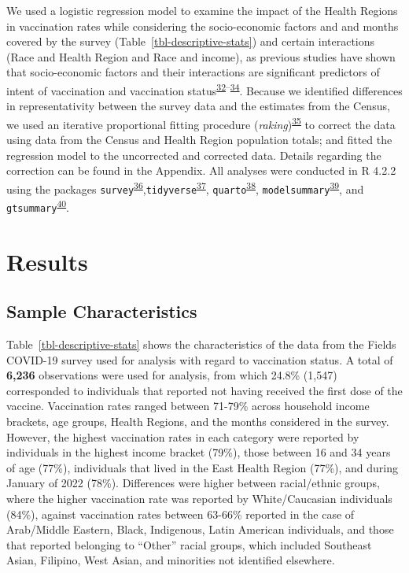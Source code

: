 \documentclass[
  letterpaper,
  DIV=11,
  numbers=noendperiod]{scrartcl}
\begin{document}
We used a logistic regression model to examine the impact of the Health
Regions in vaccination rates while considering the socio-economic
factors and and months covered by the survey
(Table~\ref{tbl-descriptive-stats}) and certain interactions (Race and
Health Region and Race and income), as previous studies have shown that
socio-economic factors and their interactions are significant predictors
of intent of vaccination and vaccination
status\textsuperscript{\protect\hyperlink{ref-nguyen2022}{32}--\protect\hyperlink{ref-cnat2022a}{34}}.
Because we identified differences in representativity between the survey
data and the estimates from the Census, we used an iterative
proportional fitting procedure
(\emph{raking})\textsuperscript{\protect\hyperlink{ref-deming1940}{35}}
to correct the data using data from the Census and Health Region
population totals; and fitted the regression model to the uncorrected
and corrected data. Details regarding the correction can be found in the
Appendix. All analyses were conducted in R 4.2.2 using the packages
\texttt{survey}\textsuperscript{\protect\hyperlink{ref-lumley2011}{36}},\texttt{tidyverse}\textsuperscript{\protect\hyperlink{ref-wickham2019}{37}},
\texttt{quarto}\textsuperscript{\protect\hyperlink{ref-quarto}{38}},
\texttt{modelsummary}\textsuperscript{\protect\hyperlink{ref-modelsummary}{39}},
and
\texttt{gtsummary}\textsuperscript{\protect\hyperlink{ref-gtsummary}{40}}.

\hypertarget{results}{%
\section{Results}\label{results}}

\hypertarget{sample-characteristics}{%
\subsection{Sample Characteristics}\label{sample-characteristics}}

Table~\ref{tbl-descriptive-stats} shows the characteristics of the data
from the Fields COVID-19 survey used for analysis with regard to
vaccination status. A total of \textbf{6,236} observations were used for
analysis, from which 24.8\% (1,547) corresponded to individuals that
reported not having received the first dose of the vaccine. Vaccination
rates ranged between 71-79\% across household income brackets, age
groups, Health Regions, and the months considered in the survey.
However, the highest vaccination rates in each category were reported by
individuals in the highest income bracket (79\%), those between 16 and
34 years of age (77\%), individuals that lived in the East Health Region
(77\%), and during January of 2022 (78\%). Differences were higher
between racial/ethnic groups, where the higher vaccination rate was
reported by White/Caucasian individuals (84\%), against vaccination
rates between 63-66\% reported in the case of Arab/Middle Eastern,
Black, Indigenous, Latin American individuals, and those that reported
belonging to ``Other'' racial groups, which included Southeast Asian,
Filipino, West Asian, and minorities not identified elsewhere.
\end{document}
